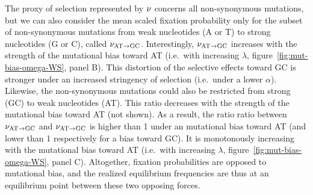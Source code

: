 The proxy of selection represented by $\nu$ concerns all non-synonymous mutations, but we can also consider the mean scaled fixation probability only for the subset of non-synonymous mutations from weak nucleotides (A or T) to strong nucleotides (G or C), called $\nu_{\text{AT} \rightarrow \text{GC}}$.
Interestingly, $\nu_{\text{AT} \rightarrow \text{GC}}$ increases with the strength of the mutational bias toward AT (i.e.~with increasing $\lambda$, figure~\ref{fig:mut-bias-omega-WS}, panel B).
This distortion of the selective effects toward GC is stronger under an increased stringency of selection (i.e.~under a lower $\alpha$).
Likewise, the non-synonymous mutations could also be restricted from strong (GC) to weak nucleotides (AT).
This ratio decreases with the strength of the mutational bias toward AT (not shown).
As a result, the ratio ratio between $\nu_{\text{AT} \rightarrow \text{GC}}$ and $\nu_{\text{AT} \rightarrow \text{GC}}$ is higher than 1 under an mutational bias toward AT (and lower than 1 respectively for a bias toward GC).
It is monotonously increasing with the mutational bias toward AT (i.e.~with increasing $\lambda$, figure~\ref{fig:mut-bias-omega-WS}, panel C).
Altogether, fixation probabilities are opposed to mutational bias, and the realized equilibrium frequencies are thus at an equilibrium point between these two opposing forces.

